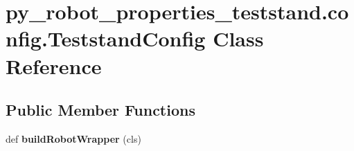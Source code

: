 \hypertarget{classpy__robot__properties__teststand_1_1config_1_1TeststandConfig}{}\section{py\+\_\+robot\+\_\+properties\+\_\+teststand.\+config.\+Teststand\+Config Class Reference}
\label{classpy__robot__properties__teststand_1_1config_1_1TeststandConfig}
\subsection*{Public Member Functions}
\begin{DoxyCompactItemize}
\item 
\mbox{\label{classpy__robot__properties__teststand_1_1config_1_1TeststandConfig_ad0bd7dd74ddf8ca9f8a4c8523f560e6e}} 
def {\bfseries build\+Robot\+Wrapper} (cls)
\end{DoxyCompactItemize}
